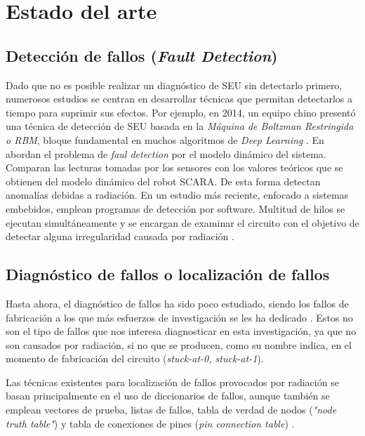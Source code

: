 \chapter{Estado del arte}
\label{ch:EstadoDelArte}

\section{Detección de fallos (\textit{Fault Detection})}
\label{sec:FaultDetection}
Dado que no es posible realizar
un diagnóstico de \gls{SEU} sin detectarlo primero, numerosos estudios se centran
en desarrollar técnicas que permitan detectarlos a tiempo para suprimir sus 
efectos. Por ejemplo, en 2014, un equipo chino presentó una técnica de detección 
de \gls{SEU} basada en la \textit{Máquina de Boltzman Restringida o \gls{RBM}}, 
bloque fundamental en muchos algoritmos de \textit{Deep Learning} 
\cite{RBMSEUdetection}. En \cite{SCARA} abordan el problema de \textit{faul 
detection} por el modelo dinámico del sistema. Comparan las lecturas tomadas por
los sensores con los valores teóricos que se obtienen del modelo dinámico del
robot SCARA. De esta forma detectan anomalías debidas a radiación. En un estudio
más reciente, enfocado a sistemas embebidos, emplean programas de detección por
software. Multitud de hilos se ejecutan simultáneamente y se encargan de examinar
el circuito con el objetivo de detectar alguna irregularidad causada por
radiación \cite{DetectingSEUs}.


\section{Diagnóstico de fallos o localización de fallos}
\label{sec:FaultLocation}
Hasta ahora, el diagnóstico de fallos ha sido poco estudiado, siendo los fallos de
fabricación a los que más esfuerzos de investigación se les ha dedicado
\cite{VLSI, EfficientSA0SA1, RepairSA0SA1, LargeComb, ANewRep, FILC, FDIRC}.
Estos no son el tipo de fallos que nos interesa diagnosticar en esta
investigación, ya que no son causados por radiación, si no que se producen, como
su nombre indica, en el momento de fabricación del circuito (\textit{stuck-at-0,
stuck-at-1}).

Las técnicas existentes para localización de fallos provocados por radiación se
basan principalmente en el uso de diccionarios de fallos, aunque también se
emplean vectores de prueba, listas de fallos, tabla de verdad de nodos
(\textit{"node truth table"}) y tabla de conexiones de pines (\textit{pin
connection table}) \cite{DiagnosisTechniques, LASAR, RTFDandD}. 

